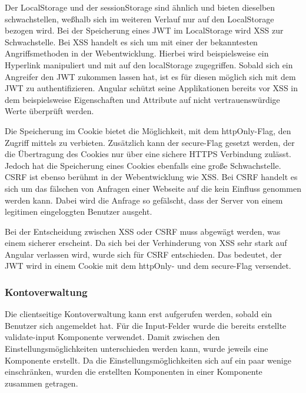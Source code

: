 Der LocalStorage und der sessionStorage sind ähnlich und bieten dieselben schwachstellen, weßhalb sich im weiteren Verlauf nur auf den LocalStorage bezogen wird. Bei der Speicherung eines \gls{JWT} im LocalStorage wird \gls{XSS} zur Schwachstelle. Bei \gls{XSS} handelt es sich um mit einer der bekanntesten Angriffsmethoden in der Webentwicklung. Hierbei wird beispielsweise ein Hyperlink manipuliert und mit \JS auf den localStorage zugegriffen. Sobald sich ein Angreifer den \gls{JWT} zukommen lassen hat, ist es für diesen möglich sich mit dem \gls{JWT} zu authentifizieren. Angular schützt seine Applikationen bereits vor \gls{XSS} in dem beispielsweise Eigenschaften und Attribute auf nicht vertrauenswürdige Werte überprüft werden.

Die Speicherung im Cookie bietet die Möglichkeit, mit dem httpOnly-Flag, den Zugriff mittels \JS zu verbieten. Zusätzlich kann der secure-Flag gesetzt werden, der die Übertragung des Cookies nur über eine sichere \gls{HTTPS} Verbindung zulässt. Jedoch hat die Speicherung eines Cookies ebenfalls eine große Schwachstelle. \gls{CSRF} ist ebenso berühmt in der Webentwicklung wie \gls{XSS}. Bei \gls{CSRF} handelt es sich um das fälschen von Anfragen einer Webseite auf die kein Einfluss genommen werden kann. Dabei wird die Anfrage so gefälscht, dass der Server von einem legitimen eingeloggten Benutzer ausgeht.

Bei der Entscheidung zwischen \gls{XSS} oder \gls{CSRF} muss abgewägt werden, was einem sicherer erscheint. Da sich bei der Verhinderung von \gls{XSS} sehr stark auf Angular verlassen wird, wurde sich für \gls{CSRF} entschieden. Das bedeutet, der \gls{JWT} wird in einem Cookie mit dem httpOnly- und dem secure-Flag versendet.

\subsubsection{Kontoverwaltung}
\label{sec:kontoverwaltung}
Die clientseitige Kontoverwaltung kann erst aufgerufen werden, sobald ein Benutzer sich angemeldet hat. Für die Input-Felder wurde die bereits erstellte validate-input Komponente verwendet. Damit zwischen den Einstellungsmöglichkeiten unterschieden werden kann, wurde jeweils eine Komponente erstellt. Da die Einstellungsmöglichkeiten sich auf ein paar wenige einschränken, wurden die erstellten Komponenten in einer Komponente zusammen getragen. 

